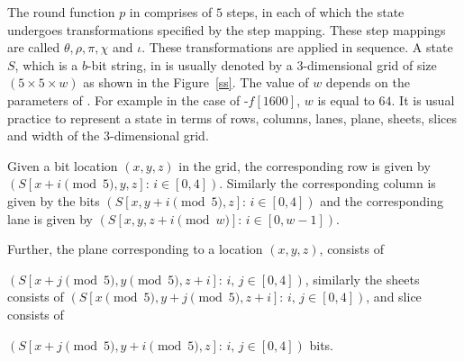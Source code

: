 The round function $p$ in \Keccak{} comprises of $5$ steps, in each of which the state undergoes transformations specified by the step mapping. These step mappings are called $\theta, \rho, \pi, \chi$ and  $\iota$. These transformations are applied in sequence. A state $S$, which is a $b$-bit string, in \Keccak{} is usually denoted by a $3$-dimensional grid of size $(5 \times 5 \times w)$ as shown in the Figure~\ref{ss}. The value of $w$ depends on the parameters of \Keccak{}. For example in the case of \Keccak-$f\left[1600\right]$, $w$ is equal to $64$. It is usual practice to represent a state in terms of rows, columns, lanes, plane, sheets, slices and width of the $3$-dimensional grid.

Given a bit location $(x,y,z)$ in the grid, the corresponding row is given by $\left( S[x+i \pmod 5,y,z] : \, i \in [0,4] \right)$. Similarly the corresponding column is given by the bits $\left( S[x,y+i \pmod 5,z] : \, i \in [0,4] \right)$ and the corresponding lane is given by $\left( S[x,y,z+i \pmod w] : \, i \in [0,w-1] \right)$. 

Further, the plane corresponding to a location $(x,y,z)$, consists of 

$\left( S[x+j \pmod 5,y \pmod 5,z + i] : \, i,\,j \in [0,4] \right)$, similarly the sheets consists of $\left( S[x \pmod 5,y+j \pmod 5,z + i] : \, i,\,j \in [0,4] \right)$, and slice consists of 

$\left( S[x+j \pmod 5,y+i \pmod 5,z] : \, i,\,j \in [0,4] \right)$ bits.

